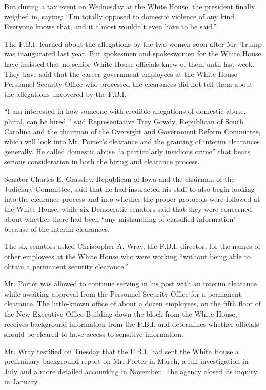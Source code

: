 But during a tax event on Wednesday at the White House, the president
finally weighed in, saying: ``I'm totally opposed to domestic violence
of any kind. Everyone knows that, and it almost wouldn't even have to be
said.''

The F.B.I. learned about the allegations by the two women soon after Mr.
Trump was inaugurated last year. But spokesmen and spokeswomen for the
White House have insisted that no senior White House officials knew of
them until last week. They have said that the career government
employees at the White House Personnel Security Office who processed the
clearances did not tell them about the allegations uncovered by the
F.B.I.

``I am interested in how someone with credible allegations of domestic
abuse, plural, can be hired,'' said Representative Trey Gowdy,
Republican of South Carolina and the chairman of the Oversight and
Government Reform Committee, which will look into Mr. Porter's clearance
and the granting of interim clearances generally. He called domestic
abuse ``a particularly insidious crime'' that bears serious
consideration in both the hiring and clearance process.

Senator Charles E. Grassley, Republican of Iowa and the chairman of the
Judiciary Committee, said that he had instructed his staff to also begin
looking into the clearance process and into whether the proper protocols
were followed at the White House, while six Democratic senators said
that they were concerned about whether there had been ``any mishandling
of classified information'' because of the interim clearances.

The six senators asked Christopher A. Wray, the F.B.I. director, for the
names of other employees at the White House who were working ``without
being able to obtain a permanent security clearance.''

Mr. Porter was allowed to continue serving in his post with an interim
clearance while awaiting approval from the Personnel Security Office for
a permanent clearance. The little-known office of about a dozen
employees, on the fifth floor of the New Executive Office Building down
the block from the White House, receives background information from the
F.B.I. and determines whether officials should be cleared to have access
to sensitive information.

Mr. Wray testified on Tuesday that the F.B.I. had sent the White House a
preliminary background report on Mr. Porter in March, a full
investigation in July and a more detailed accounting in November. The
agency closed its inquiry in January.

